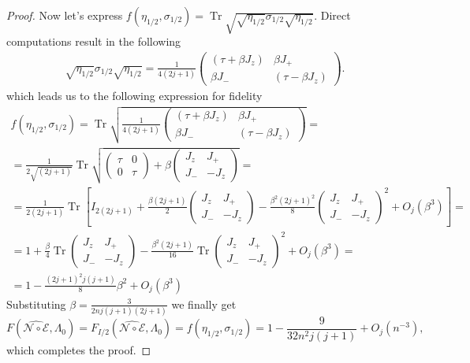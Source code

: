 \documentclass[10pt,twocolumn,superscriptaddress,aps,amsmath,amssymb,citeautoscript,floatfix,prx]{revtex4-2}
\theoremstyle{plain}
\theoremstyle{plain}
\theoremstyle{plain}
\theoremstyle{plain}
\theoremstyle{plain}
\theoremstyle{plain}
\theoremstyle{plain}
\theoremstyle{definition}
\theoremstyle{plain}
\begin{document}
\begin{appendix}
\begin{proof}
Now let's express 
$
    f(\eta_{1/2},\sigma_{1/2}) = \operatorname{Tr} \sqrt{\sqrt{\eta_{1/2}} \sigma_{1/2} \sqrt{\eta_{1/2}}} .
$
Direct computations result in the following
\[ 
\begin{gathered}
    \sqrt{\eta_{1/2}} \sigma_{1/2} \sqrt{\eta_{1/2}}=\frac{1}{4(2 j+1)}\begin{pmatrix}
\left(\tau+\beta J_z\right) & \beta J_+ \\
\beta J_- & \left(\tau-\beta J_z\right)
    \end{pmatrix}.
 \end{gathered}
\]  
which leads us to the following expression for fidelity
\[
\begin{gathered}
    f(\eta_{1/2},\sigma_{1/2})=\operatorname{Tr} \sqrt{ \frac{1}{4(2 j+1)}\begin{pmatrix}
\left(\tau+\beta J_z\right) & \beta  J_+ \\
\beta  J_- & \left(\tau-\beta J_z\right)
    \end{pmatrix}} =\\
    = \frac{1}{2\sqrt{(2 j+1)}}\operatorname{Tr} \sqrt{ \begin{pmatrix}
\tau & 0 \\
0 & \tau
    \end{pmatrix}+\beta\begin{pmatrix}
J_z & J_+ \\
J_- & -J_z
    \end{pmatrix}}=\\
    =\frac{1}{2 (2j+1)} \operatorname{Tr}\left[I_{2(2j+1)}+\frac{\beta (2j+1)}{2} \begin{pmatrix}
J_z & J_+ \\
J_- & -J_z
    \end{pmatrix}-\frac{\beta^2 (2j+1)^2}{8} \begin{pmatrix}
J_z & J_+ \\
J_- & -J_z
    \end{pmatrix}^2+O_{j}\left(\beta^3\right)\right] =\\ =
    1+\frac{\beta}{4} \operatorname{Tr} \begin{pmatrix}
J_z & J_+ \\
J_- & -J_z
    \end{pmatrix}-\frac{\beta^2 (2j+1)}{16} \operatorname{Tr} \begin{pmatrix}
J_z & J_+ \\
J_- & -J_z
    \end{pmatrix}^2+O_{j}\left(\beta^3\right)=\\=1-\frac{(2 j+1)^2 j(j+1)}{8} \beta^2+O_{j}\left(\beta^3\right)
     \end{gathered}
\]
Substituting $\beta=\frac{3}{2 n j(j+1)(2 j+1)}$ we finally get
\[
     F(\widehat{\mathcal{N} \circ \mathcal{E}}, \Lambda_0)=F_{I/2}(\widehat{\mathcal{N} \circ \mathcal{E}}, \Lambda_0)=f(\eta_{1/2},\sigma_{1/2})=1-\frac{9}{32 n^2 j(j+1)}+O_{j}\left(n^{-3}\right),
\]
which completes the proof.
\end{proof}


\end{appendix}
\end{document}
